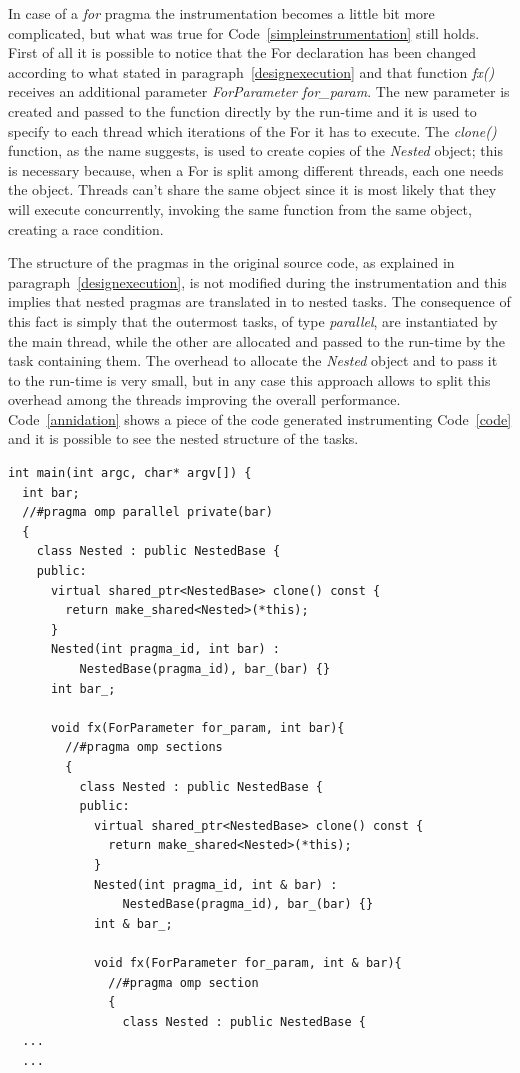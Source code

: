 \documentclass[a4paper,11pt,oneside]{book}
\begin{document}
In case of a \emph{for} pragma the instrumentation becomes a little bit more complicated, but what was true for Code~\ref{simpleinstrumentation} still holds. First of all it is possible to notice that the For declaration has been changed according to what stated in paragraph~\ref{designexecution} and that function \emph{fx()} receives an additional parameter \emph{ForParameter for\_param}. The new parameter is created and passed to the function directly by the run-time and it is used to specify to each thread which iterations of the For it has to execute. The \emph{clone()} function, as the name suggests, is used to create copies of the \emph{Nested} object; this is necessary because, when a For is split among different threads, each one needs the object. Threads can’t share the same object since it is most likely that they will execute concurrently, invoking the same function from the same object, creating a race condition. 

The structure of the pragmas in the original source code, as explained in paragraph~\ref{designexecution}, is not modified during the instrumentation and this implies that nested pragmas are translated in to nested tasks. The consequence of this fact is simply that the outermost tasks, of type \emph{parallel}, are instantiated by the main thread, while the other are allocated and passed to the run-time by the task containing them. The overhead to allocate the \emph{Nested} object and to pass it to the run-time is very small, but in any case this approach allows to split this overhead among the threads improving the overall performance. Code~\ref{annidation} shows a piece of the code generated instrumenting Code~\ref{code} and it is possible to see the nested structure of the tasks.

\begin{lstlisting}[language=CCC, caption=Example of tasks annidation from Code~\ref{code}., label=annidation]
int main(int argc, char* argv[]) {
  int bar;
  //#pragma omp parallel private(bar)
  {
    class Nested : public NestedBase {
    public: 
      virtual shared_ptr<NestedBase> clone() const { 
        return make_shared<Nested>(*this); 
      } 
      Nested(int pragma_id, int bar) : 
          NestedBase(pragma_id), bar_(bar) {}
      int bar_;
  
      void fx(ForParameter for_param, int bar){
        //#pragma omp sections
        {
          class Nested : public NestedBase {
          public: 
            virtual shared_ptr<NestedBase> clone() const { 
              return make_shared<Nested>(*this); 
            } 
            Nested(int pragma_id, int & bar) : 
                NestedBase(pragma_id), bar_(bar) {}
            int & bar_;
            
            void fx(ForParameter for_param, int & bar){
              //#pragma omp section
              {
                class Nested : public NestedBase {
  ...
  ...
\end{lstlisting}
\end{document}
